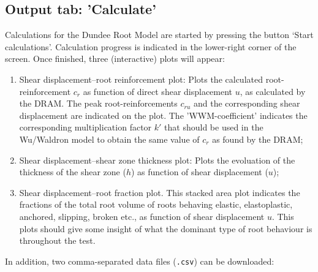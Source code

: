 \documentclass[a4 paper, 11  pt]{article}
\begin{document}
\subsection{Output tab: 'Calculate'}
\label{sec:outputdrm}
Calculations for the Dundee Root Model are started by pressing the button `Start calculations'.
Calculation progress is indicated in the lower-right corner of the screen.
Once finished, three (interactive) plots will appear:
\begin{enumerate}
	\parskip=1pt
	\itemsep=0pt
	\item Shear displacement--root reinforcement plot: Plots the calculated root-reinforcement $c_r$ as function of direct shear displacement $u$, as calculated by the DRAM. The peak root-reinforcements $c_{ru}$ and the corresponding shear displacement are indicated on the plot. The 'WWM-coefficient' indicates the corresponding multiplication factor $k'$ that should be used in the Wu/Waldron model to obtain the same value of $c_r$ as found by the DRAM;
	\item Shear displacement--shear zone thickness plot: Plots the evoluation of the thickness of the shear zone ($h$) as function of shear displacement ($u$);
	\item Shear displacement--root fraction plot. This stacked area plot indicates the fractions of the total root volume of roots behaving elastic, elastoplastic, anchored, slipping, broken etc., as function of shear displacement $u$. This plots should give some insight of what the dominant type of root behaviour is throughout the test.
\end{enumerate}
In addition, two comma-separated data files (\texttt{.csv}) can be downloaded:
\end{document}
